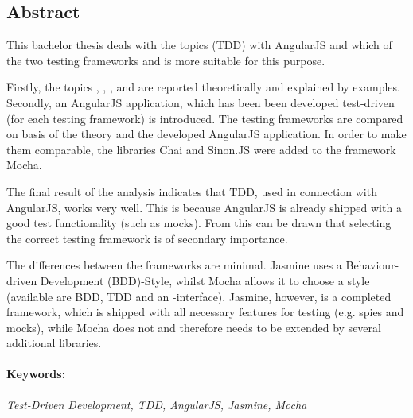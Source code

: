 \subsection*{Abstract}
\vspace{0.5cm}

This bachelor thesis deals with the topics  (TDD) with AngularJS and which of the two testing frameworks  and  is more suitable for this purpose.

Firstly, the topics , , ,  and  are reported theoretically and explained by examples. 
Secondly, an AngularJS application, which has been been developed test-driven (for each testing framework) is introduced. The testing frameworks are compared on basis of the theory and the developed AngularJS application. In order to make them comparable, the libraries Chai and Sinon.JS were added to the framework Mocha.

The final result of the analysis indicates that TDD, used in connection with AngularJS, works very well. This is because AngularJS is already shipped with a good test functionality (such as mocks). From this can be drawn that selecting the correct testing framework is of secondary importance.

The differences between the frameworks are minimal.
Jasmine uses a Behaviour-driven Development (BDD)-Style, whilst Mocha allows it to choose a style (available are BDD, TDD and an -interface). Jasmine, however, is a completed framework, which is shipped with all necessary features for testing (e.g. spies and mocks), while Mocha does not and therefore needs to be extended by several additional libraries.

\paragraph{Keywords:}
\textit{Test-Driven Development, TDD, AngularJS, Jasmine, Mocha}


